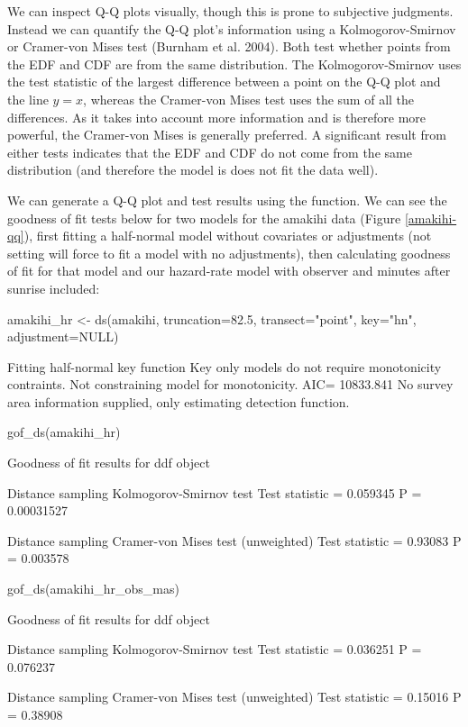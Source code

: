 \documentclass[article]{jss}
\begin{document}
We can inspect Q-Q plots visually, though this is prone to subjective
judgments. Instead we can quantify the Q-Q plot's information using a
Kolmogorov-Smirnov or Cramer-von Mises test (Burnham et al. 2004). Both
test whether points from the EDF and CDF are from the same distribution.
The Kolmogorov-Smirnov uses the test statistic of the largest difference
between a point on the Q-Q plot and the line \(y=x\), whereas the
Cramer-von Mises test uses the sum of all the differences. As it takes
into account more information and is therefore more powerful, the
Cramer-von Mises is generally preferred. A significant result from
either tests indicates that the EDF and CDF do not come from the same
distribution (and therefore the model is does not fit the data well).

We can generate a Q-Q plot and test results using the 
function. We can see the goodness of fit tests below for two models for
the amakihi data (Figure \ref{amakihi-qq}), first fitting a half-normal
model without covariates or adjustments (not setting
 will force  to fit a model with no
adjustments), then calculating goodness of fit for that model and our
hazard-rate model with observer and minutes after sunrise included:

\begin{CodeChunk}
\begin{CodeInput}
amakihi_hr <- ds(amakihi, truncation=82.5, transect="point", key="hn", adjustment=NULL)
\end{CodeInput}
\begin{CodeOutput}
Fitting half-normal key function
Key only models do not require monotonicity contraints. Not constraining model for monotonicity.
AIC= 10833.841
No survey area information supplied, only estimating detection function.
\end{CodeOutput}
\begin{CodeInput}
gof_ds(amakihi_hr)
\end{CodeInput}
\begin{CodeOutput}

Goodness of fit results for ddf object

Distance sampling Kolmogorov-Smirnov test
Test statistic =  0.059345  P =  0.00031527 

Distance sampling Cramer-von Mises test (unweighted)
Test statistic =  0.93083  P =  0.003578 
\end{CodeOutput}
\begin{CodeInput}
gof_ds(amakihi_hr_obs_mas)
\end{CodeInput}
\begin{CodeOutput}

Goodness of fit results for ddf object

Distance sampling Kolmogorov-Smirnov test
Test statistic =  0.036251  P =  0.076237 

Distance sampling Cramer-von Mises test (unweighted)
Test statistic =  0.15016  P =  0.38908 
\end{CodeOutput}
\end{CodeChunk}
\end{document}
